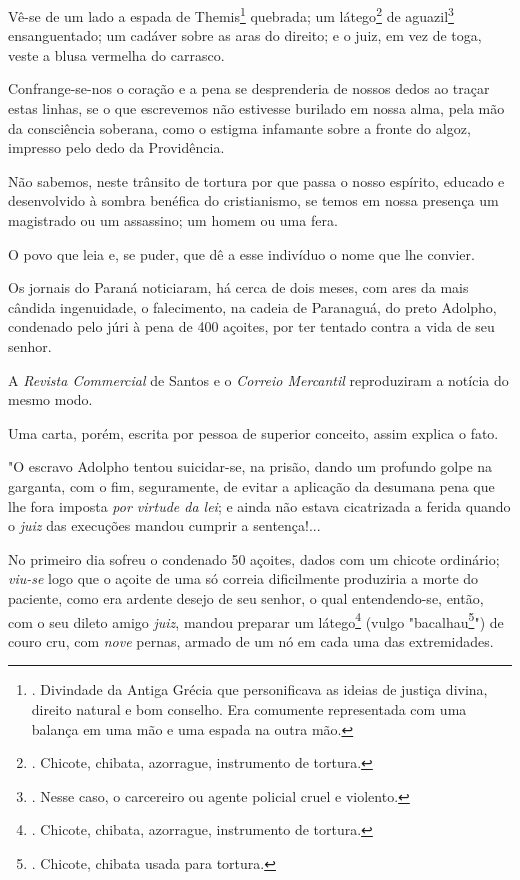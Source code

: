 Vê-se de um lado a espada de Themis\footnote{. Divindade da Antiga
  Grécia que personificava as ideias de justiça divina, direito natural
  e bom conselho. Era comumente representada com uma balança em uma mão
  e uma espada na outra mão.} quebrada; um látego\footnote{. Chicote,
  chibata, azorrague, instrumento de tortura.} de aguazil\footnote{.
  Nesse caso, o carcereiro ou agente policial cruel e violento.}
ensanguentado; um cadáver sobre as aras do direito; e o juiz, em vez de
toga, veste a blusa vermelha do carrasco.

Confrange-se-nos o coração e a pena se desprenderia de nossos dedos ao
traçar estas linhas, se o que escrevemos não estivesse burilado em nossa
alma, pela mão da consciência soberana, como o estigma infamante sobre a
fronte do algoz, impresso pelo dedo da Providência.

Não sabemos, neste trânsito de tortura por que passa o nosso espírito,
educado e desenvolvido à sombra benéfica do cristianismo, se temos em
nossa presença um magistrado ou um assassino; um homem ou uma fera.

O povo que leia e, se puder, que dê a esse indivíduo o nome que lhe
convier.

Os jornais do Paraná noticiaram, há cerca de dois meses, com ares da
mais cândida ingenuidade, o falecimento, na cadeia de Paranaguá, do
preto Adolpho, condenado pelo júri à pena de 400 açoites, por ter
tentado contra a vida de seu senhor.

A \emph{Revista Commercial} de Santos e o \emph{Correio Mercantil}
reproduziram a notícia do mesmo modo.

Uma carta, porém, escrita por pessoa de superior conceito, assim explica
o fato.

"O escravo Adolpho tentou suicidar-se, na prisão, dando um profundo
golpe na garganta, com o fim, seguramente, de evitar a aplicação da
desumana pena que lhe fora imposta \emph{por virtude da lei}; e ainda
não estava cicatrizada a ferida quando o \emph{juiz} das execuções
mandou cumprir a sentença!...

No primeiro dia sofreu o condenado 50 açoites, dados com um chicote
ordinário; \emph{viu-se} logo que o açoite de uma só correia
dificilmente produziria a morte do paciente, como era ardente desejo de
seu senhor, o qual entendendo-se, então, com o seu dileto amigo
\emph{juiz}, mandou preparar um látego\footnote{. Chicote, chibata,
  azorrague, instrumento de tortura.} (vulgo "bacalhau\footnote{.
  Chicote, chibata usada para tortura.}") de couro cru, com \emph{nove}
pernas, armado de um nó em cada uma das extremidades.

